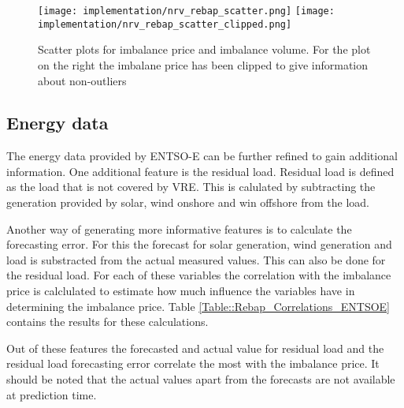 \documentclass[class=scrbook, crop=false]{standalone}
\begin{document}
\begin{figure}[ht]
            \centering
            \texttt{[image: implementation/nrv\_rebap\_scatter.png]}
            \texttt{[image: implementation/nrv\_rebap\_scatter\_clipped.png]}
            \caption[Scatter plots for imbalance price and imbalance volume. For the plot on the right the imbalane price has been clipped to give information about non-outliers]{Scatter plots for imbalance price and imbalance volume. For the plot on the right the imbalane price has been clipped to give information about non-outliers}
            \label{Figure::volume_price_scatter}
\end{figure}

    \subsection{Energy data}
    \label{Section::FE_Energy_Data}
    The energy data provided by ENTSO-E can be further refined to gain additional information.
    One additional feature is the residual load. 
    Residual load is defined as the load that is not covered by VRE. 
    This is calulated by subtracting the generation provided by solar, wind onshore and win offshore from the load.
    
    Another way of generating more informative features is to calculate the forecasting error. 
    For this the forecast for solar generation, wind generation and load is substracted from the actual measured values.
    This can also be done for the residual load.
    For each of these variables the correlation with the imbalance price is calclulated to estimate how much influence the variables have in determining the imbalance price.
    Table \ref{Table::Rebap_Correlations_ENTSOE} contains the results for these calculations. 
    
    Out of these features the forecasted and actual value for residual load and the residual load forecasting error correlate the most with the imbalance price.
    It should be noted that the actual values apart from the forecasts are not available at prediction time.    
\end{document}
